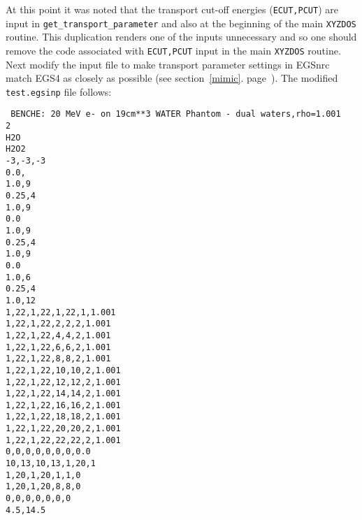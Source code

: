At this point it was noted that the
transport cut-off energies ({\tt ECUT,PCUT})
are input in {\tt get\_transport\_parameter}
and also at the beginning of the main {\tt XYZDOS} routine. This
duplication renders one of the inputs unnecessary and so one should remove
the code associated with {\tt ECUT,PCUT} input in the
main {\tt XYZDOS} routine. Next modify the input file to
make transport parameter settings in EGSnrc match EGS4
as closely as possible (see section~\ref{mimic}. page~\pageref{mimic}). The
modified {\tt test.egsinp} file follows:
\begin{flushleft}{\tt
BENCHE:  20 MeV e- on 19cm**3 WATER Phantom - dual waters,rho=1.001 \\
2 \\
H2O \\
H2O2 \\
-3,-3,-3 \\
0.0, \\
1.0,9 \\
0.25,4 \\
1.0,9 \\
0.0 \\
1.0,9 \\
0.25,4 \\
1.0,9 \\
0.0 \\
1.0,6 \\
0.25,4 \\
1.0,12 \\
1,22,1,22,1,22,1,1.001 \\
1,22,1,22,2,2,2,1.001 \\
1,22,1,22,4,4,2,1.001 \\
1,22,1,22,6,6,2,1.001 \\
1,22,1,22,8,8,2,1.001 \\
1,22,1,22,10,10,2,1.001 \\
1,22,1,22,12,12,2,1.001 \\
1,22,1,22,14,14,2,1.001 \\
1,22,1,22,16,16,2,1.001 \\
1,22,1,22,18,18,2,1.001 \\
1,22,1,22,20,20,2,1.001 \\
1,22,1,22,22,22,2,1.001 \\
0,0,0,0,0,0,0,0.0 \\
10,13,10,13,1,20,1 \\
1,20,1,20,1,1,0 \\
1,20,1,20,8,8,0 \\
0,0,0,0,0,0,0 \\
4.5,14.5 \\
}
\end{flushleft}
